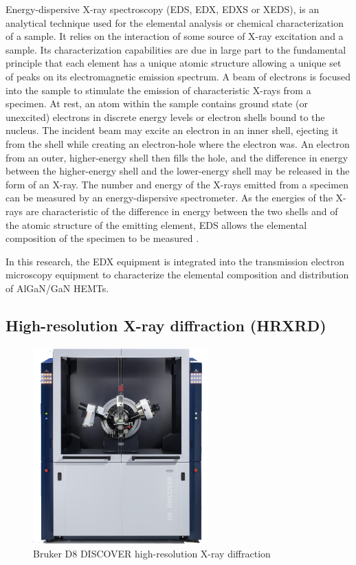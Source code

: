 Energy-dispersive X-ray spectroscopy (EDS, EDX, EDXS or XEDS),  is an analytical technique used for the elemental analysis or chemical characterization of a sample. It relies on the interaction of some source of X-ray excitation and a sample. Its characterization capabilities are due in large part to the fundamental principle that each element has a unique atomic structure allowing a unique set of peaks on its electromagnetic emission spectrum. A beam of electrons is focused into the sample to stimulate the emission of characteristic X-rays from a specimen. At rest, an atom within the sample contains ground state (or unexcited) electrons in discrete energy levels or electron shells bound to the nucleus. The incident beam may excite an electron in an inner shell, ejecting it from the shell while creating an electron-hole where the electron was. An electron from an outer, higher-energy shell then fills the hole, and the difference in energy between the higher-energy shell and the lower-energy shell may be released in the form of an X-ray. The number and energy of the X-rays emitted from a specimen can be measured by an energy-dispersive spectrometer. As the energies of the X-rays are characteristic of the difference in energy between the two shells and of the atomic structure of the emitting element, EDS allows the elemental composition of the specimen to be measured \cite{goldstein2017scanning}.

In this research, the EDX equipment is integrated into the transmission electron microscopy equipment to characterize the elemental composition and distribution of AlGaN/GaN HEMTs.

\subsection{High-resolution X-ray diffraction (HRXRD)}

\begin{figure}[ht] 
\centering    
\includegraphics[width=0.6\textwidth]{xrd}
\caption[Bruker D8 DISCOVER high-resolution X-ray diffraction]{Bruker D8 DISCOVER high-resolution X-ray diffraction}
\label{fig:xrd}
\end{figure}

